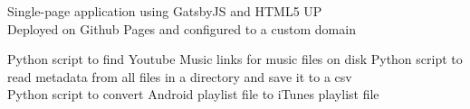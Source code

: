 \documentclass[]{resume}
\begin{document}
\begin{minipage}[t]{0.66\textwidth}
Single-page application using GatsbyJS and HTML5 UP 
\\ Deployed on Github Pages and configured to a custom domain

Python script to find Youtube Music links for music files on disk
Python script to read metadata from all files in a directory and save it to a csv \\
Python script to convert Android playlist file to iTunes playlist file


\end{minipage} 
\end{document}
